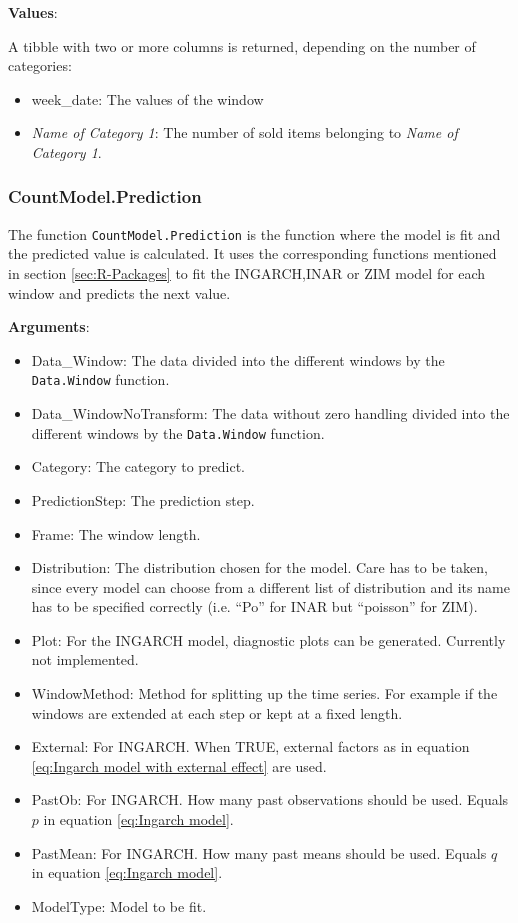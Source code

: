 \textbf{Values}:

A tibble with two or more columns is returned, depending on the number of categories: 

\begin{itemize}
	\item week\_date: The values of the window
	\item \textit{Name of Category 1}: The number of sold items belonging to \textit{Name of Category 1}.
\end{itemize}

\subsubsection{CountModel.Prediction}
\label{sec:CountModel.Prediction}

The function \texttt{CountModel.Prediction} is the function where the model is fit and the predicted value is calculated. It uses the corresponding functions mentioned in section \ref{sec:R-Packages} to fit the INGARCH,INAR or ZIM model for each window and predicts the next value. 

\textbf{Arguments}:

\begin{itemize}
	\item Data\_Window: The data divided into the different windows by the \texttt{Data.Window} function.
	\item Data\_WindowNoTransform: The data without zero handling divided into the different windows by the \texttt{Data.Window} function.
  \item Category: The category to predict. 
  \item PredictionStep: The prediction step.
  \item Frame: The window length.
  \item Distribution: The distribution chosen for the model. Care has to be taken, since every model can choose from a different list of distribution and its name has to be specified correctly (i.e. "`Po"' for INAR but "`poisson"' for ZIM). 
  \item Plot: For the INGARCH model, diagnostic plots can be generated. Currently not implemented.
  \item WindowMethod: Method for splitting up the time series. For example if the windows are extended at each step or kept at a fixed length.
  \item External: For INGARCH. When TRUE, external factors as in equation \ref{eq:Ingarch model with external effect} are used.
  \item PastOb: For INGARCH. How many past observations should be used. Equals $p$ in equation \ref{eq:Ingarch model}.
  \item PastMean: For INGARCH. How many past means should be used. Equals $q$ in equation \ref{eq:Ingarch model}.
  \item ModelType: Model to be fit. 
\end{itemize}

